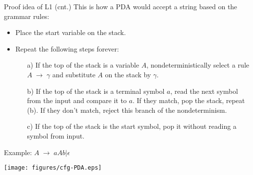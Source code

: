 \documentclass{prosper}%
\newcommand{\ra}{\mbox{$\;\rightarrow\;$}}
\begin{document}
\begin{comment}
\item The PDA's nondeterminism will come in handy, as it allows it to guess the sequence of correct substitutions.
\item $P$'s design sketch: $P$ will push on the stack left-sentential forms of $G$; and it will go through these sentential forms, making one substitution after another. Eventually it {\blue may} arrive at a configuration (a string) that contains only terminals. Then $P$ accepts if this string matches $w$.
\end{itemize}
\end{slide}
\end{comment}

\begin{slide}{Proof idea of L1 (cnt.)}
This is how a PDA would accept a string based on the grammar rules:
\begin{itemize}
\item Place the start variable on the stack.
\item Repeat the following steps forever:
\begin{enumerate}
\item[a)] If the top of the stack is a variable $A$, nondeterministically select a rule $A \ra \gamma$ and substitute $A$ on the stack by $\gamma$.
\item[b)] If the top of the stack is a terminal symbol $a$, read the next symbol from the input and compare it to $a$. If they match, pop the stack, repeat (b). If they don't match, reject this branch of the nondeterminism.
\item[c)] If the top of the stack is the start symbol, pop it without reading a symbol from input.
\end{enumerate}
\end{itemize}
\end{slide}

\begin{slide}{Example: $A\ra aAb | \epsilon$}
\begin{center}
\texttt{[image: figures/cfg-PDA.eps]}
\end{center}
\end{slide}
\end{document}

